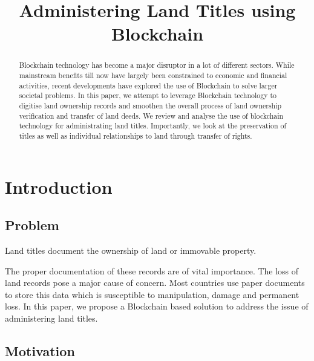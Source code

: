 \documentclass[conference]{IEEEtran}
\begin{document}
\title{Administering Land Titles using Blockchain}

\author{
\and
{}
\and
{}
}

\maketitle

\begin{abstract}
Blockchain technology has become a major disruptor in a lot of different sectors. While mainstream benefits till now have largely been constrained to economic and financial activities, recent developments have explored the use of Blockchain to solve larger societal problems. In this paper, we attempt to leverage Blockchain technology to digitise land ownership records and smoothen the overall process of land ownership verification and transfer of land deeds. We review and analyse the use of blockchain technology for administrating land titles. Importantly, we look at the preservation of titles as well as individual relationships to land through transfer of rights.
\end{abstract}

\section{Introduction}
\subsection{Problem}
Land titles document the ownership of land or immovable property.

The proper documentation of these records are of vital importance. The loss of land records pose a major cause of concern. Most countries use paper documents to store this data which is susceptible to manipulation, damage and permanent loss. In this paper, we propose a Blockchain based solution to address the issue of administering land titles.

\subsection{Motivation}

\end{document}
